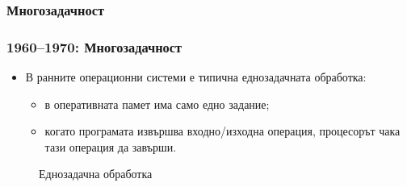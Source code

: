 \documentclass[ignorenonframetext, hyperref=unicode]{beamer}
\begin{document}

\subsubsection{Многозадачност}

\begin{frame}
\frametitle{1960--1970: Многозадачност}
\begin{itemize}
  \item В ранните операционни системи е типична еднозадачната обработка:
  \begin{itemize}
    \item в оперативната памет има само едно задание;
    \item когато програмата извършва входно/изходна операция, процесорът чака
    тази операция да завърши.
  \end{itemize}
\end{itemize}
\begin{figure}
\center
{}
\caption{Еднозадачна обработка}
\end{figure}
\end{frame}
\end{document}
